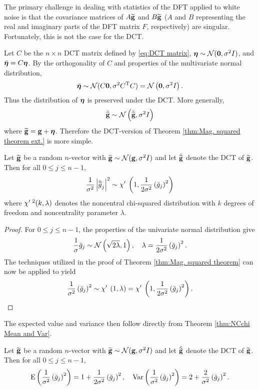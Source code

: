 The primary challenge in dealing with statistics of the DFT applied to white noise is that the covariance matrices of $A\widetilde{\mathbf{g}}$ and $B\widetilde{\mathbf{g}}$ ($A$ and $B$ representing the real and imaginary parts of the DFT matrix $F$, respectively) are singular. Fortunately, this is not the case for the DCT. \par 
Let $C$ be the $n \times n$ DCT matrix defined by \eqref{eq:DCT matrix}, $\bm{\eta} \sim \mathcal{N}(\mathbf{0},\sigma^2 I)$, and $\breve{\bm{\eta}} = C\bm{\eta}$. By the orthogonality of $C$ and properties of the multivariate normal distribution, 
\begin{equation}
\breve{\bm{\eta}} \sim \mathcal{N}(C\mathbf{0},\sigma^2 C^{\mathrm{T}}{C}) = \mathcal{N}\left(\mathbf{0},\sigma^2 I\right).
\label{eq:DCT Noise}
\end{equation}
Thus the distribution of $\bm{\eta}$ is preserved under the DCT. More generally,
\[\breve{\widetilde{\mathbf{g}}} \sim \mathcal{N}\left(\breve{\widetilde{\mathbf{g}}},\sigma^2 I\right)\]
where $\widetilde{\mathbf{g}} = \mathbf{g} + \bm{\eta}$. Therefore the DCT-version of Theorem \ref{thm:Mag. squared theorem ext.} is more simple.
\begin{theorem}
Let $\widetilde{\mathbf{g}}$ be a random $n$-vector with $\widetilde{\mathbf{g}} \sim \mathcal{N}(\mathbf{g},\sigma^2 I)$ and let $\breve{\widetilde{\mathbf{g}}}$ denote the DCT of $\widetilde{\mathbf{g}}$. Then for all $0 \leq j \leq n-1$,
\[\frac{1}{\sigma^2}\left|\breve{\widetilde{g}}_j\right|^2 \sim \chi'\:\left(1,\frac{1}{2\sigma^2}\left(\breve{g}_j\right)^2\right)\]
where $\chi'\:^2(k,\lambda)$ denotes the noncentral chi-squared distribution with $k$ degrees of freedom and noncentrality parameter $\lambda$.
\label{thm:DCT Dist}
\end{theorem}
\begin{proof}
For $0 \leq j \leq n-1$, the properties of the univariate normal distribution give
\[\frac{1}{\sigma}\breve{g}_j \sim \mathcal{N}\left(\sqrt{2\lambda},1\right), \quad \lambda = \frac{1}{2\sigma^2}\left(\breve{g}_j\right)^2.\]
The techniques utilized in the proof of Theorem \ref{thm:Mag. squared theorem} can now be applied to yield
\[\frac{1}{\sigma^2}\left(\breve{g}_j\right)^2 \sim \chi'\:\left(1,\lambda\right) = \chi'\:\left(1,\frac{1}{2\sigma^2}\left(\breve{g}_j\right)^2\right).\]
\end{proof}

The expected value and variance then follow directly from Theorem \ref{thm:NCchi Mean and Var}.

\begin{lemma}
Let $\widetilde{\mathbf{g}}$ be a random $n$-vector with $\widetilde{\mathbf{g}} \sim \mathcal{N}(\mathbf{g},\sigma^2 I)$ and let $\breve{\widetilde{\mathbf{g}}}$ denote the DCT of $\widetilde{\mathbf{g}}$. Then for all $0 \leq j \leq n-1$,
\[\operatorname{E}\left(\frac{1}{\sigma^2}\left(\breve{g}_j\right)^2\right) = 1 + \frac{1}{2\sigma^2}\left(\breve{g}_j\right)^2, \quad \operatorname{Var}\left(\frac{1}{\sigma^2}\left(\breve{g}_j\right)^2\right) = 2 + \frac{2}{\sigma^2}\left(\breve{g}_j\right)^2.\]
\label{lem:DCT Exp and Var}
\end{lemma}
